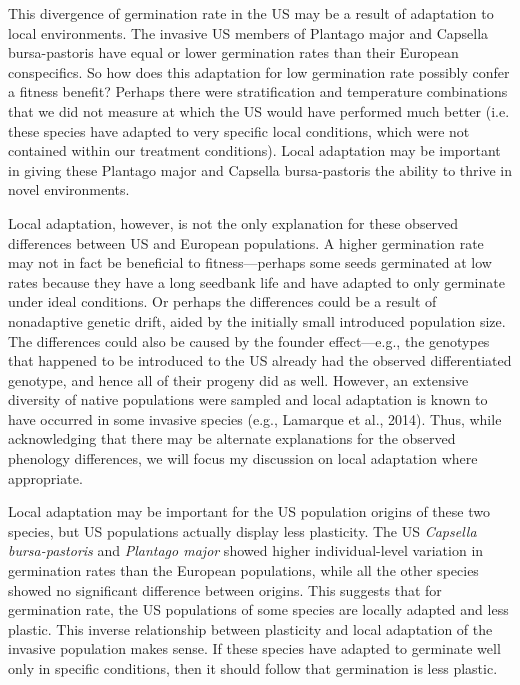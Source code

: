 \documentclass[12pt]{article}\usepackage[]{graphicx}\usepackage[]{color}
\begin{document}
	This divergence of germination rate in the US may be a result of adaptation to local environments.  The invasive US members of Plantago major and Capsella bursa-pastoris have equal or lower germination rates than their European conspecifics. So how does this adaptation for low germination rate possibly confer a fitness benefit? Perhaps there were stratification and temperature combinations that we did not measure at which the US would have performed much better (i.e. these species have adapted to very specific local conditions, which were not contained within our treatment conditions). Local adaptation may be important in giving these Plantago major and Capsella bursa-pastoris the ability to thrive in novel environments.
	
	Local adaptation, however, is not the only explanation for these observed differences between US and European populations. A higher germination rate may not in fact be beneficial to fitness—perhaps some seeds germinated at low rates because they have a long seedbank life and have adapted to only germinate under ideal conditions. Or perhaps the differences could be a result of nonadaptive genetic drift, aided by the initially small introduced population size. The differences could also be caused by the founder effect—e.g., the genotypes that happened to be introduced to the US already had the observed differentiated genotype, and hence all of their progeny did as well. However, an extensive diversity of native populations were sampled and local adaptation is known to have occurred in some invasive species (e.g., Lamarque et al., 2014). Thus, while acknowledging that there may be alternate explanations for the observed phenology differences, we will focus my discussion on local adaptation where appropriate.  
	
	Local adaptation may be important for the US population origins of these two species, but US populations actually display less plasticity. The US \textit{Capsella bursa-pastoris} and \textit{Plantago major} showed higher individual-level variation in germination rates than the European populations, while all the other species showed no significant difference between origins. This suggests that for germination rate, the US populations of some species are locally adapted and less plastic. This inverse relationship between plasticity and local adaptation of the invasive population makes sense. If these species have adapted to germinate well only in specific conditions, then it should follow that germination is less plastic. 
	
\end{document}
